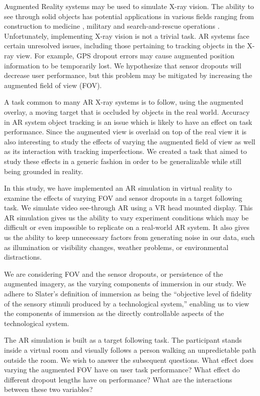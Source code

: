 \documentclass{acmsiggraph}                     %
\begin{document}
\copyrightspace

Augmented Reality systems may be used to simulate X-ray vision.  The ability to see through solid objects has potential applications in various fields ranging from construction \cite{Webster96augmentedreality} to medicine \cite{azuma95survey}, military \cite{Livingston02anaugmented} and search-and-rescue operations \cite{1528424}.  Unfortunately, implementing X-ray vision is not a trivial task.  AR systems face certain unresolved issues, including those pertaining to tracking objects in the X-ray view.  For example, GPS dropout errors \cite{4079263} may cause augmented position information to be temporarily lost.  We hypothesize that sensor dropouts will decrease user performance, but this problem may be mitigated by increasing the augmented field of view (FOV).

A task common to many AR X-ray systems is to follow, using the augmented overlay, a moving target that is occluded by objects in the real world.  Accuracy in AR system object tracking is an issue which is likely to have an effect on task performance.  Since the augmented view is overlaid on top of the real view it is also interesting to study the effects of varying the augmented field of view as well as its interaction with tracking imperfections.  We created a task that aimed to study these effects in a generic fashion in order to be generalizable while still being grounded in reality.

In this study, we have implemented an AR simulation in virtual reality to examine the effects of varying FOV and sensor dropouts in a target following task.  We simulate video see-through AR using a VR head mounted display.  This AR simulation gives us the ability to vary experiment conditions which may be difficult or even impossible to replicate on a real-world AR system.  It also gives us the ability to keep unnecessary factors from generating noise in our data, such as illumination or visibility changes, weather problems, or environmental distractions. 

We are considering FOV and the sensor dropouts, or persistence of the augmented imagery, as the varying components of immersion in our study.  We adhere to Slater's definition \cite{slater} of immersion as being the ``objective level of fidelity of the sensory stimuli produced by a technological system,''  enabling us to view the components of immersion as the directly controllable aspects of the technological system.

The AR simulation is built as a target following task.  The participant stands inside a virtual room and visually follows a person walking an unpredictable path outside the room.  We wish to answer the subsequent questions.  What effect does varying the augmented FOV have on user task performance?  What effect do different dropout lengths have on performance?  What are the interactions between these two variables?
\end{document}
